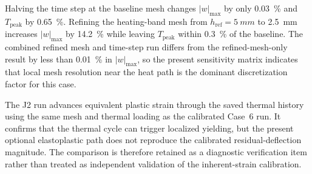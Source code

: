 \noindent Halving the time step at the baseline mesh changes $|w|_{\max}$ by only \SI{0.03}{\%} and $T_{\mathrm{peak}}$ by \SI{0.65}{\%}. Refining the heating-band mesh from $h_{\mathrm{ref}}=\SI{5}{mm}$ to \SI{2.5}{mm} increases $|w|_{\max}$ by \SI{14.2}{\%} while leaving $T_{\mathrm{peak}}$ within \SI{0.3}{\%} of the baseline. The combined refined mesh and time-step run differs from the refined-mesh-only result by less than \SI{0.01}{\%} in $|w|_{\max}$, so the present sensitivity matrix indicates that local mesh resolution near the heat path is the dominant discretization factor for this case.

\begin{table}[H]
\centering
\caption{Diagnostic comparison between the calibrated inherent-strain surrogate and the optional J2 elastoplastic mechanics path for representative Li2023 Case~6 ($v=\SI{11}{mm/s}$, $E=\SI{600}{J/mm}$, $t=\SI{14}{mm}$, two passes).}
\label{tab:li2023-elastoplastic-spotcheck}
\small
{}
\end{table}

\noindent The J2 run advances equivalent plastic strain through the saved thermal history using the same mesh and thermal loading as the calibrated Case~6 run. It confirms that the thermal cycle can trigger localized yielding, but the present optional elastoplastic path does not reproduce the calibrated residual-deflection magnitude. The comparison is therefore retained as a diagnostic verification item rather than treated as independent validation of the inherent-strain calibration.

